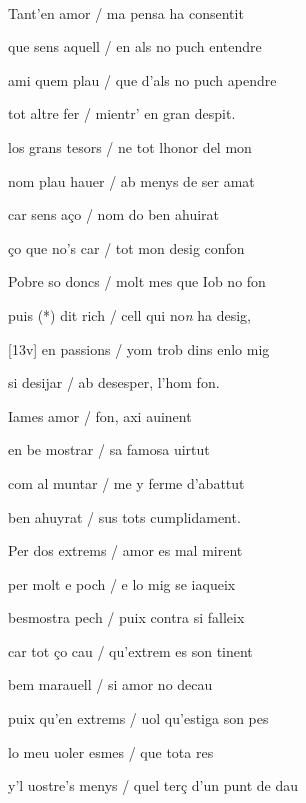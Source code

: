 \documentclass[12pt]{article}
\renewcommand{\espaiAbansEtiquetaPoema}{\vspace{0ex}}
\begin{document}
\begin{estrofa}

\espaiAbansEtiquetaPoema

\\

\end{estrofa}


\begin{estrofa}

 Tant'en amor / ma pensa ha consentit

 que sens aquell / en als no puch entendre

 ami quem plau / que d'als no puch apendre

 tot altre fer / mientr' en gran despit.

 los grans tesors / ne tot lhonor del mon

 nom plau hauer / ab menys de ser amat

 car sens a\c{c}o / nom do ben ahuirat

 \c{c}o que no's car / tot mon desig confon

\end{estrofa}



\begin{estrofa}

 Pobre so doncs / molt mes que Iob no fon

 puis (*) dit rich / cell qui no\textit{n} ha desig,

 [13v] en passions / yom trob dins enlo mig

 si desijar / ab desesper, l'hom fon.

 Iames amor / fon, axi auinent

 en be mostrar / sa famosa uirtut

 com al muntar / me y ferme d'abattut

 ben ahuyrat / sus tots cumplidament.

\end{estrofa}



\begin{estrofa}

 Per dos extrems / amor es mal mirent

 per molt e poch / e lo mig se iaqueix

 besmostra pech / puix contra si falleix

 car tot \c{c}o cau / qu'extrem es son tinent

 bem marauell / si amor no decau

 puix qu'en extrems / uol qu'estiga son pes

 lo meu uoler esmes / que tota res

 y'l uostre's menys / quel ter\c{c} d'un punt de dau

\end{estrofa}
\end{document}
